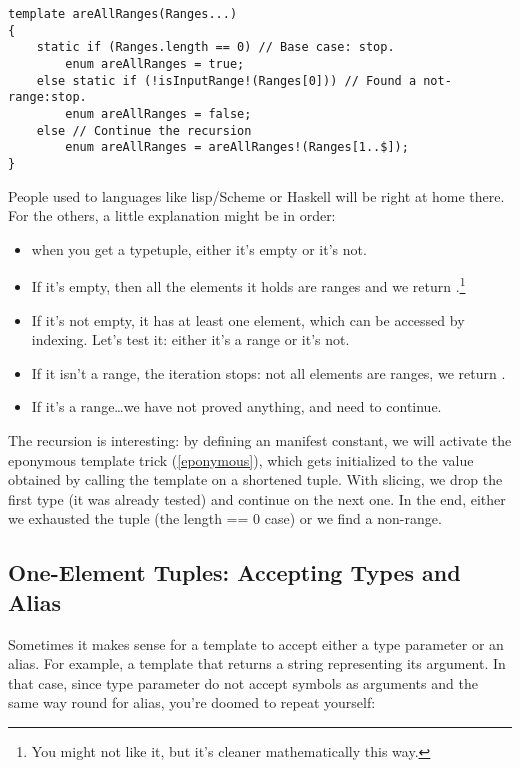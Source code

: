 \begin{verbatim}
template areAllRanges(Ranges...)
{
    static if (Ranges.length == 0) // Base case: stop.
        enum areAllRanges = true;
    else static if (!isInputRange!(Ranges[0])) // Found a not-range:stop.
        enum areAllRanges = false; 
    else // Continue the recursion
        enum areAllRanges = areAllRanges!(Ranges[1..$]); 
}     
\end{verbatim}

People used to languages like lisp/Scheme or Haskell will be right at home there. For the others, a little explanation might be in order: 

\begin{itemize}
\item when you get a typetuple, either it's empty or it's not. 
	\item If it's empty, then all the elements it holds are ranges and we return .\footnote{ You might not like it, but it's cleaner mathematically this way.} 
	\item If it's not empty, it has at least one element, which can be accessed by indexing. Let's test it: either it's a range or it's not. 
		\item If it isn't a range, the iteration stops: not all elements are ranges, we return . 
		\item If it's a range\ldots we have not proved anything, and need to continue.
\end{itemize}

The recursion is interesting: by defining an  manifest constant, we will activate the eponymous template trick (\ref{eponymous}), which gets initialized to the value obtained by calling the template on a shortened tuple. With slicing, we drop the first type (it was already tested) and continue on the next one. In the end, either we exhausted the tuple (the length == 0 case) or we find a non-range.


\subsection{One-Element Tuples: Accepting Types and Alias}

Sometimes it makes sense for a template to accept either a type parameter or an alias. For example, a template that returns a string representing its argument. In that case, since type parameter do not accept symbols as arguments and the same way round for alias, you're doomed to repeat yourself:

